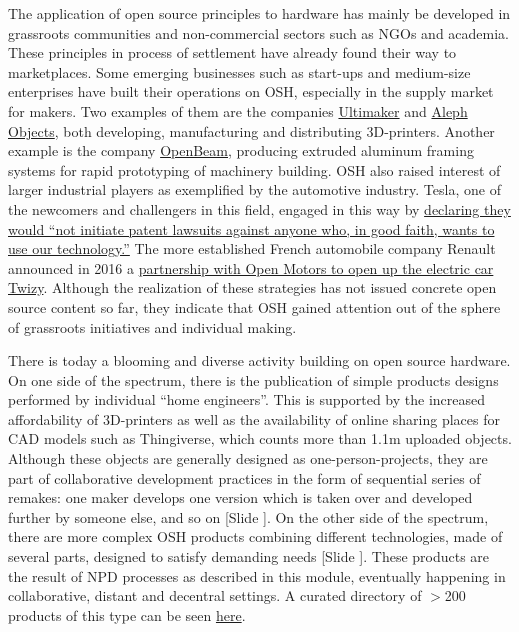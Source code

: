\documentclass{article}
\newcounter{slide}
\begin{document}
The application of open source principles to hardware has mainly be developed in grassroots communities and non-commercial sectors such as NGOs and academia. These principles in process of settlement have already found their way to marketplaces. Some emerging businesses such as start-ups and medium-size enterprises have built their operations on OSH, especially in the supply market for makers. Two examples of them are the companies \href{https://ultimaker.com/}{Ultimaker} and \href{https://www.alephobjects.com/}{Aleph Objects}, both developing, manufacturing and distributing 3D-printers. Another example is the company \href{https://ztautomations.com/openbeam/}{OpenBeam}, producing extruded aluminum framing systems for rapid prototyping of machinery building. OSH also raised interest of larger industrial players as exemplified by the automotive industry. Tesla, one of the newcomers and challengers in this field, engaged in this way by \href{https://www.tesla.com/blog/all-our-patent-are-belong-you}{declaring they would ``not initiate patent lawsuits against anyone who, in good faith, wants to use our technology.''} The more established French automobile company Renault announced in 2016 a \href{https://www.openmotors.co/renaultpomsignup/}{partnership with Open Motors to open up the electric car Twizy}. Although the realization of these strategies has not issued concrete open source content so far, they indicate that OSH gained attention out of the sphere of grassroots initiatives and individual making.

There is today a blooming and diverse activity building on open source hardware. On one side of the spectrum, there is the publication of simple products designs performed by individual ``home engineers''. This is supported by the increased affordability of 3D-printers as well as the availability of online sharing places for CAD models such as Thingiverse, which counts more than 1.1m uploaded objects. Although these objects are generally designed as one-person-projects, they are part of collaborative development practices in the form of sequential series of remakes: one maker develops one version which is taken over and developed further by someone else, and so on \cite{kyriakouKnowledgeReuseCustomization2017}{\color{blue}[Slide ]}. On the other side of the spectrum, there are more complex OSH products combining different technologies, made of several parts, designed to satisfy demanding needs {\color{blue}[Slide ]}. These products are the result of NPD processes as described in this module, eventually happening in collaborative, distant and decentral settings. A curated directory of $>$200 products of this type can be seen \href{http://opensourcedesign.cc/observatory}{here}.
\end{document}
